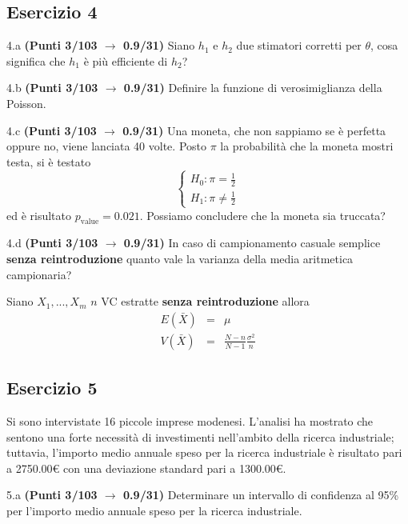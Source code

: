 \documentclass[
  11pt,
]{book}
\theoremstyle{mytheoremstyle}
\theoremstyle{mydefstyle}
\newenvironment{sol}
  {
  \begin{tcolorbox}[enhanced,breakable,arc=0.1mm,boxrule=1pt,colback=white,colframe=iblue,
  title=\bf \fontfamily{lmss}\selectfont \hspace{.5 cm} Soluzione,drop fuzzy shadow]

}{
\end{tcolorbox}
  }
\begin{document}
\subsection{Esercizio 4}\label{esercizio-4-8}

4.a \textbf{(Punti 3/103 \(\rightarrow\) 0.9/31)} Siano \(h_1\) e \(h_2\) due stimatori corretti per \(\theta\), cosa significa che \(h_1\) è più efficiente di \(h_2\)?

4.b \textbf{(Punti 3/103 \(\rightarrow\) 0.9/31)} Definire la funzione di verosimiglianza della Poisson.

4.c \textbf{(Punti 3/103 \(\rightarrow\) 0.9/31)} Una moneta, che non sappiamo se è perfetta oppure no, viene lanciata 40 volte.
Posto \(\pi\) la probabilità che la moneta mostri testa, si è testato
\[
\begin{cases}
H_0:\pi=\frac 12\\
H_1:\pi\ne\frac 12
\end{cases}
\]
ed è risultato \(p_\text{value}=0.021\). Possiamo concludere che la moneta sia truccata?

4.d \textbf{(Punti 3/103 \(\rightarrow\) 0.9/31)} In caso di campionamento casuale semplice \textbf{senza reintroduzione}
quanto vale la varianza della media aritmetica campionaria?

\begin{sol}
Siano \(X_1,...,X_m\) \(n\) VC estratte \textbf{senza reintroduzione} allora
\begin{eqnarray*}
  E(\bar X) &=&  \mu\\
  V(\bar X) &=& \frac{N-n}{N-1}\frac{\sigma^2}{n}
\end{eqnarray*}

\end{sol}

\subsection{Esercizio 5}\label{esercizio-5-7}

Si sono intervistate 16 piccole imprese modenesi.
L'analisi ha mostrato che sentono una forte necessità
di investimenti nell'ambito della ricerca industriale;
tuttavia, l'importo medio annuale speso per la ricerca industriale
è risultato pari a 2750.00€ con una deviazione standard pari
a 1300.00€.

5.a \textbf{(Punti 3/103 \(\rightarrow\) 0.9/31)} Determinare un intervallo di confidenza al 95\%
per l'importo medio annuale speso per la ricerca industriale.
\end{document}
